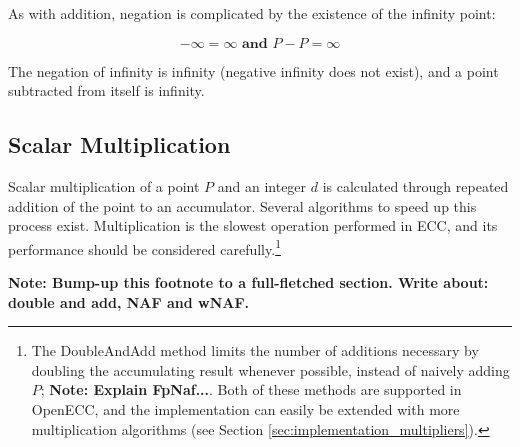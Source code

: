 As with addition, negation is complicated by the existence of the infinity point:

\begin{equation}
	-\infty = \infty \textbf{ and } P - P = \infty
\end{equation}

The negation of infinity is infinity (negative infinity does not exist), and a point subtracted from itself is infinity.\cite{hankerson2010}

\subsection{Scalar Multiplication}

Scalar multiplication of a point \(P\) and an integer \(d\) is calculated through repeated addition of the point to an accumulator.
Several algorithms to speed up this process exist. Multiplication is the slowest operation performed in ECC, and its performance should
be considered carefully.\footnote{The DoubleAndAdd method limits the number of additions necessary by doubling the accumulating result
whenever possible, instead of naively adding \(P\); \textbf{Note: Explain FpNaf...}. Both of these methods are supported in OpenECC, and
the implementation can easily be extended with more multiplication algorithms (see Section \ref{sec:implementation_multipliers}).}

\textbf{Note: Bump-up this footnote to a full-fletched section. Write about: double and add, NAF and wNAF.}